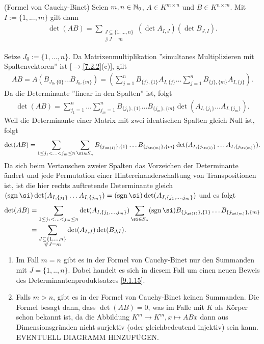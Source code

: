 \documentclass[../../main.tex]{subfiles}
\begin{document}
\begin{sat}\label{17.2.5}
(Formel von Cauchy-Binet) Seien $m,n\in \mathbb N_0$, $A\in K^{m\times n}$ und $B\in K^{n\times m}$. Mit $I:=\{1,...,m\}$ gilt dann 
\begin{align*}
\det(AB)=\sum_{\substack{J\subseteq\{1,...,n\}\\\#J=m}}(\det A_{I,J})(\det B_{J,I}).
\end{align*}
\end{sat}
\begin{cproof}
Setze $J_0:=\{1,...,n\}$. Da Matrixenmultiplikation ''simultanes Multiplizieren mit Spaltenvektoren'' ist [$\to$\ref{7.2.2}(c)], gilt
\begin{align*}
AB=A(B_{J_0,\{0\}}\hdots B_{J_0,\{m\}})=\left(\sum_{j=1}^nB_{\{j\},\{1\}}A_{I,\{j\}}\hdots\sum_{j=1}^nB_{\{j\},\{m\}}A_{I,\{j\}}\right).
\end{align*}
Da die Determinante ''linear in den Spalten'' ist, folgt
\begin{align*}
\det(AB)=\sum_{j_1=1}^n\hdots\sum_{j_m=1}^nB_{\{j_1\},\{1\}}\hdots B_{\{j_m\},\{m\}}\det(A_{I,\{j_1\}}\hdots A_{I,\{j_m\}}).
\end{align*}
Weil die Determinante einer Matrix mit zwei identischen Spalten gleich Null ist, folgt
\begin{align*}
\det(AB)=\sum_{1\le j_1<...<j_m\le n}\sum_{\si\in S_n}B_{\{j_{\si(1)}\},\{1\}}\hdots B_{\{j_{\si(m)}\},\{m\}}\det(A_{I,\{j_{\si(1)}\}}\hdots A_{I,\{j_{\si(m)}\}}).
\end{align*}
Da sich beim Vertauschen zweier Spalten das Vorzeichen der Determinante ändert und jede Permutation einer Hintereinanderschaltung von Transpositionen ist, ist die hier rechts auftretende Determinante gleich $(\sgn\si)\det(A_{I,\{j_1\}}\hdots A_{I,\{j_m\}})=(\sgn\si)\det(A_{I,\{j_1,...,j_m\}})$ und es folgt
\begin{align*}
\det(AB)&=\sum_{1\le j_1<...<j_m\le n}\det(A_{I,\{j_1,...,j_m\}})\sum_{\si\in S_n}(\sgn\si)B_{\{j_{\si(1)}\},\{1\}}\hdots B_{\{j_{\si(m)}\},\{m\}}\\
&=\sum_{\substack{J\subseteq\{1,...,n\}\\\#J=m}}\det(A_{I,J})\det(B_{J,I}).
\end{align*}
\end{cproof}

\begin{bem}\label{17.2.6}
\begin{enumerate}[\normalfont(a)]
\item Im Fall $m=n$ gibt es in der Formel von Cauchy-Binet nur den Summanden mit $J=\{1,..,n\}$. Dabei handelt es sich in diesem Fall um einen neuen Beweis des Determinantenproduktsatzes \ref{9.1.15}.

\item Falls $m>n$, gibt es in der Formel von Cauchy-Binet keinen Summanden. Die Formel besagt dann, dass $\det(AB)=0$, was im Falle mit $K$ als Körper schon bekannt ist, da die Abbildung $K^m\to K^m, x\mapsto ABx$ dann aus Dimensionsgründen nicht surjektiv (oder gleichbedeutend injektiv) sein kann. EVENTUELL DIAGRAMM HINZUFÜGEN.
\end{enumerate}
\end{bem}
\end{document}
